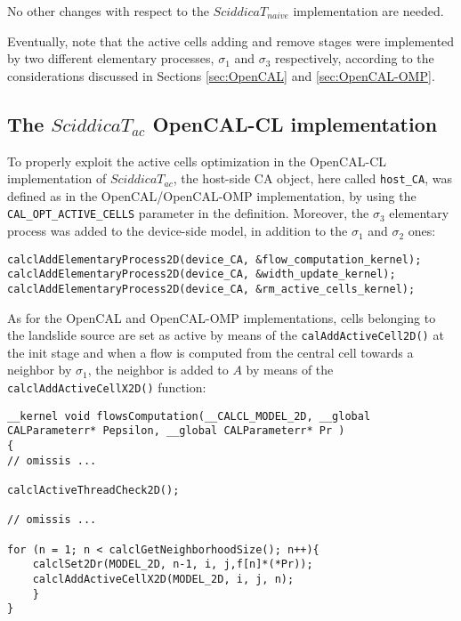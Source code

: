 \noindent No other changes with respect to the $SciddicaT_{naive}$
implementation are needed.

Eventually, note that the active cells adding and remove stages
were implemented by two different elementary processes, $\sigma_1$
and $\sigma_3$ respectively, according to the considerations
discussed in Sections \ref{sec:OpenCAL} and \ref{sec:OpenCAL-OMP}.

\subsection{The $SciddicaT_{ac}$ OpenCAL-CL implementation}
To properly exploit the active cells optimization in the
OpenCAL-CL implementation of $SciddicaT_{ac}$, the host-side CA
object, here called \verb'host_CA', was defined as in the
OpenCAL/OpenCAL-OMP implementation, by using the
\verb'CAL_OPT_ACTIVE_CELLS' parameter in the definition. Moreover,
the $\sigma_3$ elementary process was added to the device-side
model, in addition to the $\sigma_1$ and $\sigma_2$ ones:

\begin{lstlisting}
calclAddElementaryProcess2D(device_CA, &flow_computation_kernel);
calclAddElementaryProcess2D(device_CA, &width_update_kernel);
calclAddElementaryProcess2D(device_CA, &rm_active_cells_kernel);
\end{lstlisting}

\noindent As for the OpenCAL and OpenCAL-OMP implementations,
cells belonging to the landslide source are set as active by means
of the \verb'calAddActiveCell2D()' at the init stage and when a
flow is computed from the central cell towards a neighbor by
$\sigma_1$, the neighbor is added to $A$ by means of the
\verb'calclAddActiveCellX2D()' function:

\begin{lstlisting}
__kernel void flowsComputation(__CALCL_MODEL_2D, __global CALParameterr* Pepsilon, __global CALParameterr* Pr )
{
// omissis ...

calclActiveThreadCheck2D();

// omissis ...

for (n = 1; n < calclGetNeighborhoodSize(); n++){
	calclSet2Dr(MODEL_2D, n-1, i, j,f[n]*(*Pr));
	calclAddActiveCellX2D(MODEL_2D, i, j, n);
	}
}
\end{lstlisting}

